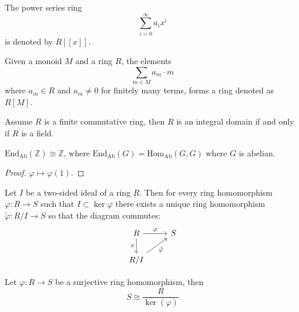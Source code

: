 \documentclass[openany]{book}
\newcommand{\Z}{\mathbb{Z}}
\begin{document}
\begin{defn}
    The power series ring 
    \begin{equation*}
        \sum_{i=0}^\infty a_ix^i
    \end{equation*}
    is denoted by $R[[x]]$.
\end{defn}

\begin{defn}
    Given a monoid $M$ and a ring $R$, the elements 
    \begin{equation*}
        \sum_{m\in M}a_m\cdot m
    \end{equation*}
    where $a_m\in R$ and $a_m\neq 0$ for finitely many  terms, forms a ring denoted as $R[M]$.
\end{defn}





\begin{prop}
    Assume $R$ is a finite commutative ring, then $R$ is an integral domain if and only if $R$ is a field.
\end{prop}




\begin{prop}
    $\text{End}_{\text{Ab}}(\Z)\cong\Z$, where $\text{End}_{\text{Ab}}(G)=\text{Hom}_{\text{Ab}}(G,G)$ where $G$ is abelian. 
\end{prop}
\begin{proof}
    $\varphi\mapsto\varphi(1)$.
\end{proof}



\begin{thm}
    Let $I$ be a two-sided ideal of a ring $R$. Then for every ring homomorphism $\varphi: R\to S$ such that $I\subset\ker\varphi$ there exists a unique ring homomorphism $\tilde{\varphi}: R/I\to S$ so that the diagram commutes:
    \[\begin{tikzcd}
        R & S \\
        {R/I}
        \arrow["\varphi", from=1-1, to=1-2]
        \arrow["\pi"', from=1-1, to=2-1]
        \arrow["{\tilde{\varphi}}"', from=2-1, to=1-2]
    \end{tikzcd}\]
\end{thm}

\begin{thm}
    Let $\varphi:R\to S$ be a surjective ring homomorphism, then 
    \begin{equation*}
        S\cong\frac{R}{\ker(\varphi)}
    \end{equation*}
\end{thm}
\end{document}
